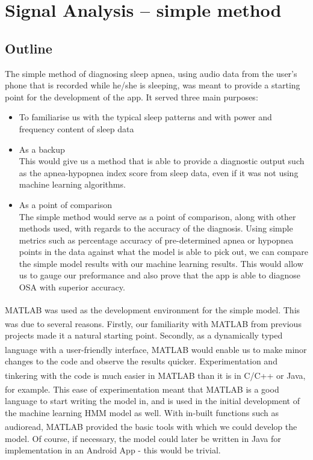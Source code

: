\section{Signal Analysis -- simple method}
\label{sec:simple-sachin}

\subsection{Outline}

The simple method of diagnosing sleep apnea, using audio data from the user's phone that is recorded while he/she is sleeping, was meant to provide a starting point for the development of the app. It served three main purposes:

\begin{itemize}
\item To familiarise us with the typical sleep patterns and with power and frequency content of sleep data
\item As a backup\\
This would give us a method that is able to provide a diagnostic output such as the apnea-hypopnea index score from sleep data, even if it was not using machine learning algorithms. 
\item As a point of comparison\\
The simple method would serve as a point of comparison, along with other methods used, with regards to the accuracy of the diagnosis. Using simple metrics such as percentage accuracy of pre-determined apnea or hypopnea points in the data against what the model is able to pick out, we can compare the simple model results with our machine learning results. This would allow us to gauge our preformance and also prove that the app is able to diagnose OSA with superior accuracy.
\end{itemize}

MATLAB\textsuperscript{\textregistered{}} was used as the development environment for the simple model. This was due to several reasons. Firstly, our familiarity with MATLAB\textsuperscript{\textregistered{}} from previous projects made it a natural starting point. Secondly, as a dynamically typed language with a user-friendly interface, MATLAB\textsuperscript{\textregistered{}} would enable us to make minor changes to the code and observe the results quicker. Experimentation and tinkering with the code is much easier in MATLAB\textsuperscript{\textregistered{}}  than it is in C/C++ or Java, for example. This ease of experimentation meant that MATLAB\textsuperscript{\textregistered{}} is a good language to start writing the model in, and is used in the initial development of the machine learning HMM model as well. With in-built functions such as audioread, MATLAB\textsuperscript{\textregistered{}}  provided the basic tools with which we could develop the model. Of course, if necessary, the model could later be written in Java for implementation in an Android App - this would be trivial.

